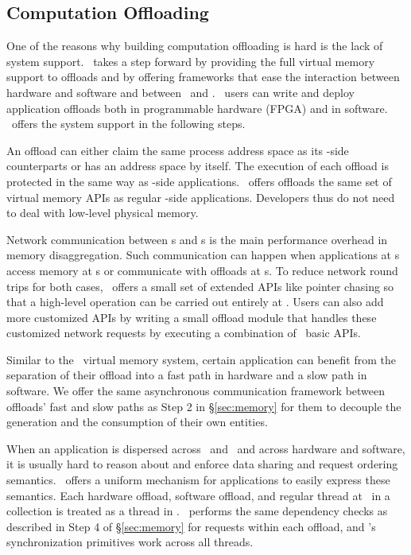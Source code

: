 \fi


\subsection{Computation Offloading}
\label{sec:offload}

One of the reasons why building computation offloading is hard is the lack of system support.
\sys\ takes a step forward by providing the full virtual memory support to offloads and 
by offering frameworks that ease the interaction between hardware and software and between \CN\ and \MN.
\sys\ users can write and deploy application offloads both in programmable hardware (FPGA)
and in software.
\sys\ offers the system support in the following steps.

An offload can either claim the same process address space as its \CN-side counterparts
or has an address space by itself.
The execution of each offload is protected in the same way as \CN-side applications.
\sys\ offers offloads the same set of virtual memory APIs as regular \CN-side applications.
Developers thus do not need to deal with low-level physical memory.

Network communication between \CN{}s and \MN{}s is the main performance overhead in memory disaggregation.
Such communication can happen when applications at \CN{}s access memory at \MN{}s or communicate with offloads at \MN{}s.
To reduce network round trips for both cases,
\sys\ offers a small set of extended APIs like pointer chasing so that a high-level operation can be carried out entirely at \MN.
Users can also add more customized APIs
by writing a small offload module that handles these customized network requests
by executing a combination of \sys\ basic APIs.

Similar to the \sys\ virtual memory system, certain application can benefit from
the separation of their offload into a fast path in hardware and a slow path in software.
We offer the same asynchronous communication framework between offloads' fast and slow paths as Step 2 in \S\ref{sec:memory}
for them to decouple the generation and the consumption of their own entities.

When an application is dispersed across \CN\ and \MN\ and across hardware and software, 
it is usually hard to reason about and enforce data sharing and request ordering semantics. 
\sys\ offers a uniform mechanism for applications to easily express these semantics.
Each hardware offload, software offload, and regular thread at \CN\ in a collection is 
treated as a thread in \sys.
\sys\ performs the same dependency checks as described in Step 4 of \S\ref{sec:memory} for requests within each offload,
and \sys's synchronization primitives work across all threads.

\fi
